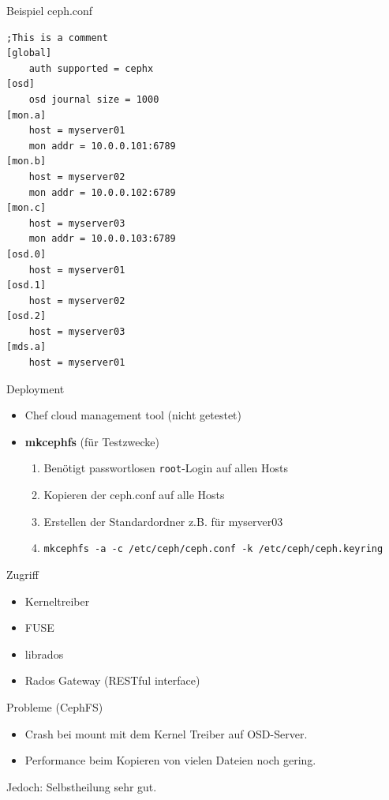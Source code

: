 \documentclass[notes=hide,yellow]{beamer}
\begin{document}
\begin{frame}[fragile]{Beispiel ceph.conf}

\begin{lstlisting}
;This is a comment
[global]
	auth supported = cephx
[osd]
	osd journal size = 1000
[mon.a]
	host = myserver01
	mon addr = 10.0.0.101:6789
[mon.b]
	host = myserver02
	mon addr = 10.0.0.102:6789
[mon.c]
	host = myserver03
	mon addr = 10.0.0.103:6789
[osd.0]
	host = myserver01
[osd.1]
	host = myserver02
[osd.2]
	host = myserver03
[mds.a]
	host = myserver01
\end{lstlisting}
\end{frame}



\begin{frame}{Deployment}
	\begin{itemize}
		\item Chef cloud management tool (nicht getestet)
		\item \textbf{mkcephfs} (f\"ur Testzwecke)
			\begin{enumerate}
				\item Ben\"otigt passwortlosen \texttt{root}-Login auf allen Hosts
				\item Kopieren der ceph.conf auf alle Hosts
				\item Erstellen der Standardordner z.B. f\"ur myserver03
				\item \texttt{mkcephfs -a -c /etc/ceph/ceph.conf -k /etc/ceph/ceph.keyring}
			\end{enumerate}
	\end{itemize}
\end{frame}



\begin{frame}{Zugriff}
	\begin{itemize}
		\item Kerneltreiber
		\item FUSE
		\item librados
		\item Rados Gateway (RESTful interface)
	\end{itemize}
\end{frame}

\begin{frame}{Probleme (CephFS)}
    \begin{itemize}
        \item Crash bei mount mit dem Kernel Treiber auf OSD-Server.
        \item Performance beim Kopieren von vielen Dateien noch gering.
    \end{itemize}
    \alert{Jedoch:} Selbstheilung sehr gut.
\end{frame}
\end{document}
